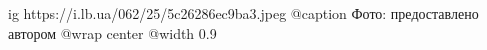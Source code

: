  
 
 
 
 

\ifcmt
  ig https://i.lb.ua/062/25/5c26286ec9ba3.jpeg
	@caption Фото: предоставлено автором
  @wrap center
  @width 0.9
\fi
